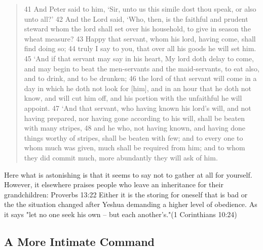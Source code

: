 \documentclass[11pt]{article}
\begin{document}
\begin{quote}
41 And Peter said to him, `Sir, unto us this simile dost thou speak, or also unto all?'
42 And the Lord said, `Who, then, is the faithful and prudent steward whom the lord shall set over his household, to give in season the wheat measure?
43 Happy that servant, whom his lord, having come, shall find doing so;
44 truly I say to you, that over all his goods he will set him.
45 `And if that servant may say in his heart, My lord doth delay to come, and may begin to beat the men-servants and the maid-servants, to eat also, and to drink, and to be drunken;
46 the lord of that servant will come in a day in which he doth not look for [him], and in an hour that he doth not know, and will cut him off, and his portion with the unfaithful he will appoint.
47 `And that servant, who having known his lord's will, and not having prepared, nor having gone according to his will, shall be beaten with many stripes,
48 and he who, not having known, and having done things worthy of stripes, shall be beaten with few; and to every one to whom much was given, much shall be required from him; and to whom they did commit much, more abundantly they will ask of him.
\end{quote}
Here what is astonishing is that it seems to say not to gather at all for yourself. However, it elsewhere praises people who leave an inheritance for their grandchildren: Proverbs 13:22 
Either it is the storing for oneself that is bad or the the situation changed after Yeshua demanding a higher level of obedience. 
As it says "let no one seek his own -- but each another's."(1 Corinthians 10:24)

\subsection{A More Intimate Command} \label{a more intimate command}
\end{document}
